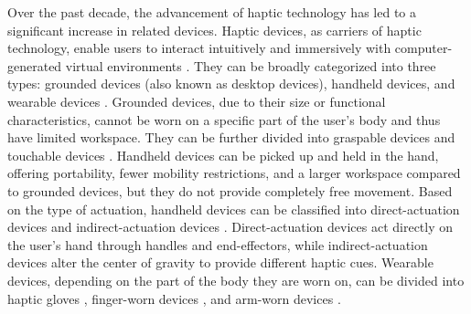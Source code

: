 \documentclass[runningheads]{llncs}
\begin{document}
Over the past decade, the advancement of haptic technology has led to a significant increase in related devices. Haptic devices, as carriers of haptic technology, enable users to interact intuitively and immersively with computer-generated virtual environments \cite{sreelakshmi2017haptic}. They can be broadly categorized into three types: grounded devices (also known as desktop devices), handheld devices, and wearable devices \cite{adilkhanov2022haptic}. Grounded devices, due to their size or functional characteristics, cannot be worn on a specific part of the user's body and thus have limited workspace. They can be further divided into graspable devices \cite{adel2018rendering,zarate2020contact,feick2023voxelhap} and touchable devices \cite{adilkhanov2020vibero,goetz2020patch}. Handheld devices can be picked up and held in the hand, offering portability, fewer mobility restrictions, and a larger workspace compared to grounded devices, but they do not provide completely free movement. Based on the type of actuation, handheld devices can be classified into direct-actuation devices \cite{sakr2020haptic,chen2019haptivec} and indirect-actuation devices \cite{kovacs2020haptic}. Direct-actuation devices act directly on the user's hand through handles and end-effectors, while indirect-actuation devices alter the center of gravity to provide different haptic cues. Wearable devices, depending on the part of the body they are worn on, can be divided into haptic gloves \cite{ozioko2022smart}, finger-worn devices \cite{chinello2019modular,preechayasomboon2021haplets}, and arm-worn devices \cite{zhao2020wearable,pezent2022explorations}.
\end{document}
